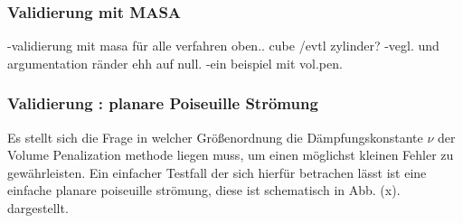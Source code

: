 \subsubsection{Validierung mit MASA}
-validierung mit masa für alle verfahren oben.. cube /evtl zylinder?
-vegl. und argumentation ränder ehh auf null.
-ein beispiel mit vol.pen.

\subsubsection{Validierung : planare Poiseuille Strömung}
Es stellt sich die Frage in welcher Größenordnung die Dämpfungskonstante $\nu$ der Volume Penalization methode liegen muss, um einen möglichst kleinen
Fehler zu gewährleisten. Ein einfacher Testfall der sich hierfür betrachen lässt ist eine einfache planare poiseuille strömung, diese ist schematisch in Abb. (x). dargestellt.
